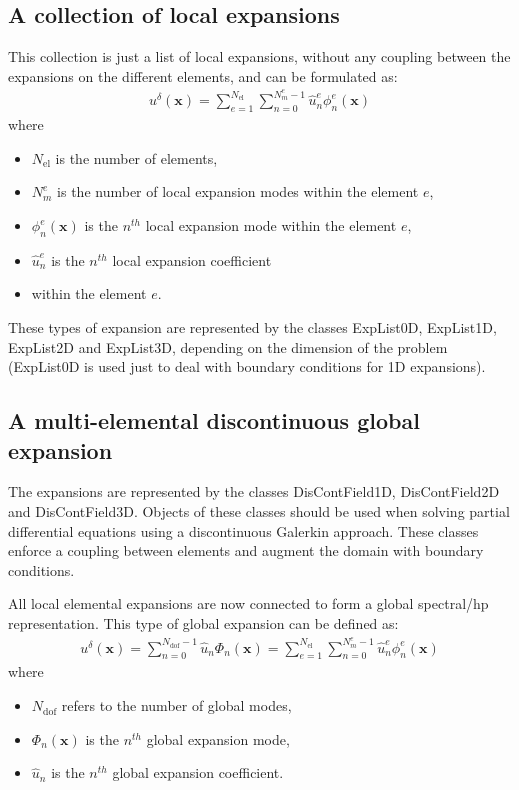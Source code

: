 \subsection{A collection of local expansions}
This collection is just a list of local expansions, without any coupling between
the expansions on the different elements, and can be formulated as:
\begin{align*}
u^{\delta}(\boldsymbol{x})=\sum_{e=1}^{{N_{\mathrm{el}}}}\sum_{n=0}^{N^{e}_m-1}\hat{u}_n^e\phi_n^e(\boldsymbol{x})
\end{align*}
where
\begin{itemize}
\item ${N_{\mathrm{el}}}$ is the number of elements, 
\item $N^{e}_m$ is the number of local expansion modes within the
element $e$, 
\item $\phi_n^e(\boldsymbol{x})$ is the $n^{th}$ local expansion mode within
the element $e$, 
\item $\hat{u}_n^e$ is the $n^{th}$ local expansion coefficient 
\item within the element $e$.
\end{itemize}

These types of expansion are represented by the classes ExpList0D, ExpList1D,
ExpList2D and ExpList3D, depending on the dimension of the problem (ExpList0D is
used just to deal with boundary conditions for 1D expansions).

\subsection{A multi-elemental discontinuous global expansion}
The expansions are represented by the classes DisContField1D, DisContField2D and
DisContField3D. Objects of these classes should be used when solving partial
differential equations using a discontinuous Galerkin approach. These classes
enforce a coupling between elements and augment the domain with boundary
conditions.

All local elemental expansions are now connected to form a global spectral/hp
representation. This type of global expansion can be defined as:
\begin{align*}
u^{\delta}(\boldsymbol{x})=\sum_{n=0}^{N_{\mathrm{dof}}-1}\hat{u}_n
  \Phi_n(\boldsymbol{x})=\sum_{e=1}^{{N_{\mathrm{el}}}}
  \sum_{n=0}^{N^{e}_m-1}\hat{u}_n^e\phi_n^e(\boldsymbol{x})
\end{align*}
where
\begin{itemize}
\item $N_{\mathrm{dof}}$ refers to the number of global modes, 
\item $\Phi_n(\boldsymbol{x})$ is the $n^{th}$ global
expansion mode, 
\item $\hat{u}_n$ is the $n^{th}$ global expansion coefficient.
\end{itemize}

